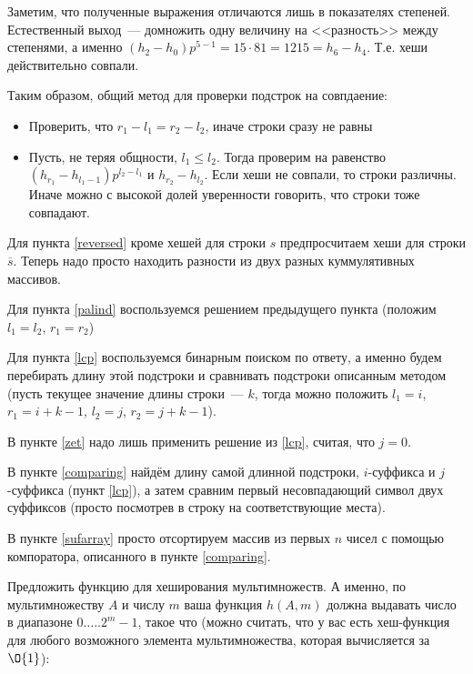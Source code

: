 \documentclass[addpoints]{exam}
\begin{document}
\begin{questions}
\begin{solution}
Заметим, что полученные выражения отличаются лишь в показателях степеней. Естественный выход~--- домножить одну величину на <<разность>> между степенями, а именно $(h_2 - h_0) p^{5-1} = 15 \cdot 81 = 1215 = h_6 - h_4$. Т.е. хеши действительно совпали.

Таким образом, общий метод для проверки подстрок на совпдаение:

\begin{itemize}
\item Проверить, что $r_1 - l_1 = r_2 - l_2$, иначе строки сразу не равны
\item Пусть, не теряя общности, $l_1 \leqslant l_2$. Тогда проверим на равенство $(h_{r_1} - h_{l_1 - 1}) p^{l_2 - l_1}$ и $h_{r_2} - h_{l_2}$. Если хеши не совпали, то строки различны. Иначе можно с высокой долей уверенности говорить, что строки тоже совпадают.
\end{itemize}

Для пункта \ref{reversed} кроме хешей для строки $s$ предпросчитаем хеши для строки $\overline{s}$. Теперь надо просто находить разности из двух разных куммулятивных массивов.

Для пункта \ref{palind} воспользуемся решением предыдущего пункта (положим $l_1 = l_2$, $r_1 = r_2$)

Для пункта \ref{lcp} воспользуемся бинарным поиском по ответу, а именно будем перебирать длину этой подстроки и сравнивать подстроки описанным методом (пусть текущее значение длины строки~--- $k$, тогда можно положить $l_1 = i$, $r_1 = i + k - 1$, $l_2 = j$, $r_2 = j + k - 1$).

В пункте \ref{zet} надо лишь применить решение из \ref{lcp}, считая, что $j=0$.

В пункте \ref{comparing} найдём длину самой длинной подстроки, $i$-суффикса и $j$-суффикса (пункт \ref{lcp}), а затем сравним первый несовпадающий символ двух суффиксов (просто посмотрев в строку на соответствующие места).

В пункте \ref{sufarray} просто отсортируем массив из первых $n$ чисел с помощью компоратора, описанного в пункте \ref{comparing}.


\end{solution}

\question Предложить функцию для хеширования мультимножеств. А именно, по мультимножеству $A$ и числу $m$ ваша функция $h(A, m)$ должна выдавать число в диапазоне $0\ldots..2^{m}-1$, такое что (можно считать, что у вас есть хеш-функция для любого возможного элемента мультимножества, которая вычисляется за $\O{1}$):


\end{questions}
\end{document}
